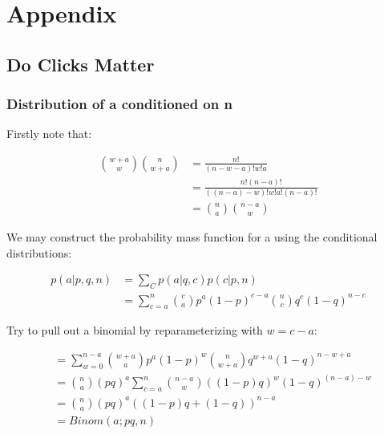 \documentclass[11pt,a4,singlespacing,titlepagenumber=on]{scrreprt}
\numberwithin{equation}{chapter} %
\theoremstyle{remark}
\begin{document}
{}


\appendix %


\chapter{Appendix}

\section{Do Clicks Matter}

\subsection{Distribution of a conditioned on n}

Firstly note that:

\begin{align}
{w+a \choose w}{n \choose w+a} &= \frac{n!}{(n-w-a)!w!a} \\
	&= \frac{n!(n-a)!}{((n-a)-w)!w!a!(n-a)!} \\
	&=  {n \choose a}{n-a \choose w}
\end{align}

We may construct the probability mass function for a using the conditional distributions:

\begin{align}
p(a|p,q,n) &= \sum_C p(a|q,c)p(c|p,n) \\
 &= \sum_{c=a}^n {c \choose a} p^a(1-p)^{c-a} {n \choose c} q^c (1-q)^{n-c}
\end{align}

Try to pull out a binomial by reparameterizing with $ w = c-a$:

\begin{align}
&= \sum_{w=0}^{n-a} {w+a \choose a} p^a(1-p)^w {n \choose w+a} q^{w+a} (1-q)^{n-w+a} \\
&= {n \choose a} (pq)^a \sum_{c=a}^n {n-a \choose w} ((1-p)q)^w (1-q)^{(n-a)-w} \\
&= {n \choose a} (pq)^a ((1-p)q +  (1-q))^{n-a} \\
&= Binom(a;pq,n)
\end{align}
\end{document}
